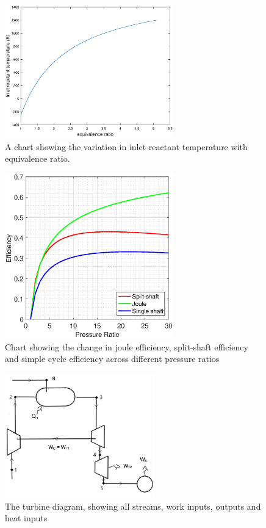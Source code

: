 \begin{figure} [h]
\centering
\includegraphics[width=0.65\textwidth]{./pictures/combustor.eps}
  \caption{A chart showing the variation in inlet reactant temperature with equivalence ratio.} \label{fig:flametemp}
  \end{figure} 
\begin{figure} [H]
\centering
\includegraphics[width=0.65\textwidth]{./pictures/efficiencyPT.eps}
  \caption{Chart showing the change in joule efficiency, split-shaft efficiency and simple cycle efficiency across different pressure ratios} \label{fig:twinefficiency}
  \end{figure}
  
\begin{figure} [H]
\centering
\includegraphics[width=0.58\textwidth]{./pictures/plantdiagram.png}
  \caption{The turbine diagram, showing all streams, work inputs, outputs and heat inputs} \label{fig:turbinediagram}
  \end{figure}
  
